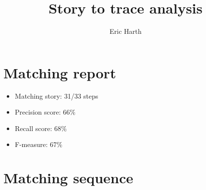 \documentclass [12pt] {article}
\begin{document}
\title{Story to trace analysis}
\author{Eric Harth}
\maketitle
\clearpage
\section{Matching report}
\begin{itemize}
\item Matching story: 31/33 steps
\item Precision score: 66\%
\item Recall score: 68\%
\item F-measure: 67\%
\end{itemize}
\clearpage
\section{Matching sequence}
\end{document}
